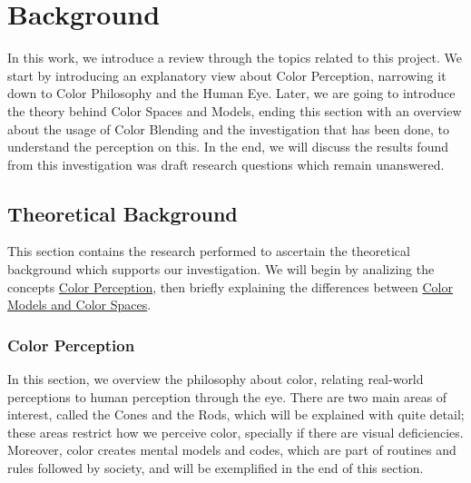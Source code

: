 
\chapter{Background}
\label{chapter:background}
%
In this work, we introduce a review through the topics related to this project. We start by introducing
an explanatory view about Color Perception, narrowing it down to Color Philosophy and the Human Eye. Later,
we are going to introduce the theory behind Color Spaces and Models, ending this section with an overview about
the usage of Color Blending and the investigation that has been done, to understand the perception on this. In
the end, we will discuss the results found from this investigation was draft research questions which remain
unanswered.
%
\section{Theoretical Background}
\label{sec:theory_background}
%
This section contains the research performed to ascertain the theoretical background which supports our investigation.
We will begin by analizing the concepts \ul{Color Perception}, then briefly explaining the differences between \ul{Color
Models and Color Spaces}.
%
\subsection{Color Perception}
\label{subsec:colorperception}
%
In this section, we overview the philosophy about color, relating real-world perceptions to human perception
through the eye. There are two main areas of interest, called the Cones and the Rods, which will be explained
with quite detail; these areas restrict how we perceive color, specially if there are visual deficiencies.
Moreover, color creates mental models and codes, which are part of routines and rules followed by society, and will be exemplified in the end of this section.
%
